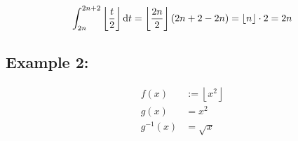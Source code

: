 \documentclass[12pt]{article}
\begin{document}
		\begin{align*}
			\int_{2n}^{2n+2}\left\lfloor\frac t2\right\rfloor\text dt
			= \left\lfloor\frac{2n}2\right\rfloor(2n+2-2n)
			= \lfloor n\rfloor\cdot2 = 2n
		\end{align*}

	\subsection*{Example 2:}

		\begin{minipage}{0.5\textwidth}
			\begin{align*}
				f(x) & := \left\lfloor x^2\right\rfloor\\
				g(x) & = x^2\\
				g^{-1}(x) & = \sqrt x\\
			\end{align*}
		\end{minipage}
		\hfill
\end{document}
